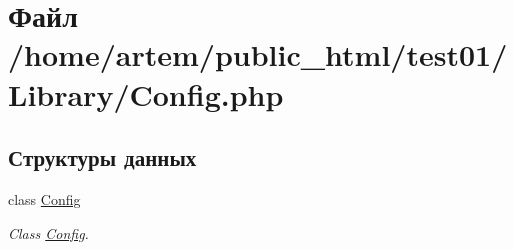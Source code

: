 \hypertarget{_config_8php}{\section{Файл /home/artem/public\-\_\-html/test01/\-Library/\-Config.php}
\label{_config_8php}
}
\subsection*{Структуры данных}
\begin{DoxyCompactItemize}
\item 
class \hyperlink{class_config}{Config}
\begin{DoxyCompactList}\small\item\em Class \hyperlink{class_config}{Config}. \end{DoxyCompactList}\end{DoxyCompactItemize}
